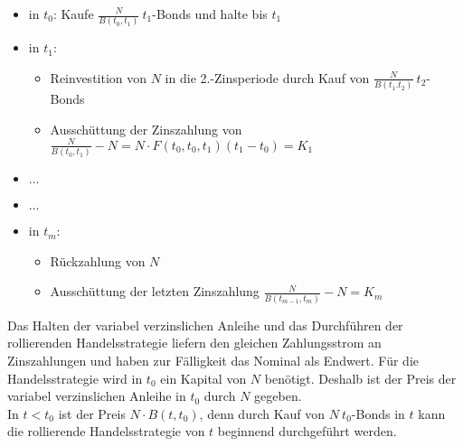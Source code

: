\begin{itemize}
	\item in $t_0$: Kaufe $\frac{N}{B(t_0,t_1)}~t_1$-Bonds und halte bis $t_1$
	\item in $t_1$: 
	\begin{itemize}
		\item Reinvestition von $N$ in die 2.-Zinsperiode durch Kauf von $\frac{N}{B(t_1.t_2)}~t_2$-Bonds
		\item Ausschüttung der Zinszahlung von $\frac{N}{B(t_0,t_1)}-N=N\cdot F(t_0,t_0,t_1)(t_1-t_0)=K_1$
	\end{itemize}
	\item $\dots$
	\item$\dots$
	\item in $t_m$:
	\begin{itemize}
		\item Rückzahlung von $N$
		\item Ausschüttung der letzten Zinszahlung $\frac{N}{B(t_{m-1},t_m)}-N=K_m$
	\end{itemize}
\end{itemize}
Das Halten der variabel verzinslichen Anleihe und das Durchführen der rollierenden Handelsstrategie liefern den gleichen Zahlungsstrom an Zinszahlungen und haben zur Fälligkeit das Nominal als Endwert. 
Für die Handelsstrategie wird in $t_0$ ein Kapital von $N$ benötigt. 
Deshalb ist der Preis der variabel verzinslichen Anleihe in $t_0$ durch $N$ gegeben. \\
In $t<t_0$ ist der Preis $N\cdot B(t,t_0)$, denn durch Kauf von $N~t_0$-Bonds in $t$ kann die rollierende Handelsstrategie von $t$ beginnend durchgeführt werden.


